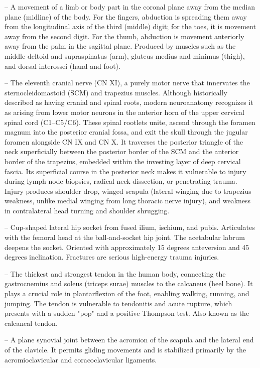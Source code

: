 -- A movement of a limb or body part in the coronal plane away from the median plane (midline) of the body. For the fingers, abduction is spreading them away from the longitudinal axis of the third (middle) digit; for the toes, it is movement away from the second digit. For the thumb, abduction is movement anteriorly away from the palm in the sagittal plane. Produced by muscles such as the middle deltoid and supraspinatus (arm), gluteus medius and minimus (thigh), and dorsal interossei (hand and foot).

-- The eleventh cranial nerve (CN XI), a purely motor nerve that innervates the sternocleidomastoid (SCM) and trapezius muscles. Although historically described as having cranial and spinal roots, modern neuroanatomy recognizes it as arising from lower motor neurons in the anterior horn of the upper cervical spinal cord (C1--C5/C6). These spinal rootlets unite, ascend through the foramen magnum into the posterior cranial fossa, and exit the skull through the jugular foramen alongside CN IX and CN X. It traverses the posterior triangle of the neck superficially between the posterior border of the SCM and the anterior border of the trapezius, embedded within the investing layer of deep cervical fascia. Its superficial course in the posterior neck makes it vulnerable to injury during lymph node biopsies, radical neck dissection, or penetrating trauma. Injury produces shoulder drop, winged scapula (lateral winging due to trapezius weakness, unlike medial winging from long thoracic nerve injury), and weakness in contralateral head turning and shoulder shrugging.

-- Cup-shaped lateral hip socket from fused ilium, ischium, and pubis. Articulates with the femoral head at the ball-and-socket hip joint. The acetabular labrum deepens the socket. Oriented with approximately 15 degrees anteversion and 45 degrees inclination. Fractures are serious high-energy trauma injuries.

-- The thickest and strongest tendon in the human body, connecting the gastrocnemius and soleus (triceps surae) muscles to the calcaneus (heel bone). It plays a crucial role in plantarflexion of the foot, enabling walking, running, and jumping. The tendon is vulnerable to tendonitis and acute rupture, which presents with a sudden "pop" and a positive Thompson test. Also known as the calcaneal tendon.

-- A plane synovial joint between the acromion of the scapula and the lateral end of the clavicle. It permits gliding movements and is stabilized primarily by the acromioclavicular and coracoclavicular ligaments.

